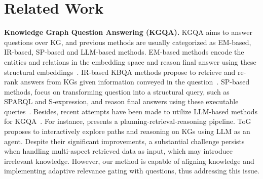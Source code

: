 \section{Related Work} \label{sec:relatedwork}


\noindent
\textbf{Knowledge Graph Question Answering (KGQA).}
KGQA aims to answer questions over KG, and previous methods are usually categorized as EM-based, IR-based, SP-based and LLM-based methods.
EM-based methods encode the entities and relations in the embedding space and reason final answer using these structural embeddings~\cite{shi2021transfernet}.
IR-based KBQA methods propose to retrieve and re-rank answers from KGs given information conveyed in the question~\cite{chen2019uhop,zhang2022subgraph}.
SP-based methods, focus on transforming question into a structural query, such as SPARQL and S-expression, and reason final answers using these executable queries~\cite{liang2017neural,lan2020query}.
Besides, recent attempts have been made to utilize LLM-based methods for KGQA~\cite{jiang2023unikgqa,chenplan}.
For instance, \citet{RoG} presents a planning-retrieval-reasoning pipeline. ToG \cite{TOG} proposes to interactively explore paths and reasoning on KGs using LLM as an agent.
Despite their significant improvements, a substantial challenge persists when handling multi-aspect retrieved data as input, which may introduce irrelevant knowledge.
However, our method is capable of aligning knowledge and implementing adaptive relevance gating with questions, thus addressing this issue.



